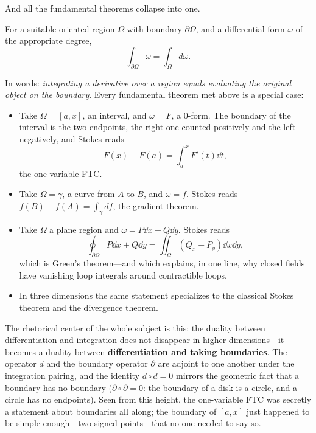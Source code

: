 \documentclass{essay}
\begin{document}
And all the fundamental theorems collapse into one.

\begin{theorem}
  For a suitable oriented region \(\Omega\) with boundary \(\partial\Omega\), and a differential form \(\omega\) of the appropriate degree,
  \[ \int_{\partial\Omega} \omega = \int_{\Omega} d\omega. \]
\end{theorem}

In words: \emph{integrating a derivative over a region equals evaluating the original object on the boundary}. Every fundamental theorem met above is a special case:
\begin{itemize}[itemsep=2pt]
  \item Take \(\Omega = [a,x]\), an interval, and \(\omega = F\), a 0-form. The boundary of the interval is the two endpoints, the right one counted positively and the left negatively, and Stokes reads
    \[ F(x) - F(a) = \int_{a}^{x} F'(t)\dd t, \]
    the one-variable FTC.
  \item Take \(\Omega = \gamma\), a curve from \(A\) to \(B\), and \(\omega = f\). Stokes reads \(f(B) - f(A) = \int_{\gamma} df\), the gradient theorem.
  \item Take \(\Omega\) a plane region and \(\omega = P\dd x + Q\dd y\). Stokes reads
    \[ \oint_{\partial\Omega} P\dd x + Q\dd y = \iint_{\Omega} (Q_{x} - P_{y})\dd x \dd y, \]
    which is Green's theorem---and which explains, in one line, why closed fields have vanishing loop integrals around contractible loops.
  \item In three dimensions the same statement specializes to the classical Stokes theorem and the divergence theorem.
\end{itemize}

The rhetorical center of the whole subject is this: the duality between differentiation and integration does not disappear in higher dimensions---it becomes a duality between \textbf{differentiation and taking boundaries}. The operator \(d\) and the boundary operator \(\partial\) are adjoint to one another under the integration pairing, and the identity \(d \circ d = 0\) mirrors the geometric fact that a boundary has no boundary (\(\partial \circ \partial = 0\): the boundary of a disk is a circle, and a circle has no endpoints). Seen from this height, the one-variable FTC was secretly a statement about boundaries all along; the boundary of \([a,x]\) just happened to be simple enough---two signed points---that no one needed to say so.
\end{document}
